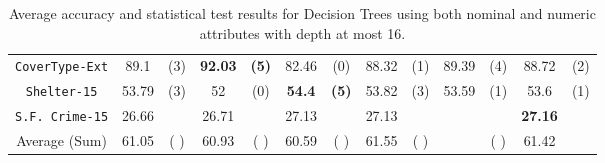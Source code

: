 \begin{table}
\begin{tabular}{c|cc|cc|cc|cc|cc|cc}
{\tt CoverType-Ext}  &  89.1          &  (3)              &  {\bf 92.03}&  {\bf (5)}    &  82.46       &  (0)               &  88.32      & (1)            & 89.39        & (4)       & 88.72        & (2)       \\
{\tt Shelter-15}     &  53.79         &  (3)              &  52         &  (0)          &  {\bf 54.4}  &  {\bf (5)}         &  53.82      & (3)            & 53.59        & (1)       & 53.6         & (1)       \\   
{\tt S.F. Crime-15}  &  26.66         &                   &  26.71      &               &  27.13       &                    &  27.13      &                &              &           & {\bf 27.16}  &           \\
\hline
Average (Sum)        &  61.05         &  ( )              & 60.93       &  ( )          &   60.59      &  (  )              &  61.55      & (  )           &              & ( )       & 61.42        &

\end{tabular}
\caption{Average accuracy and statistical test results for  Decision Trees using both nominal and numeric attributes with depth at most 16.}
\label{exp:numeric-16}
\normalsize
\end{table}

